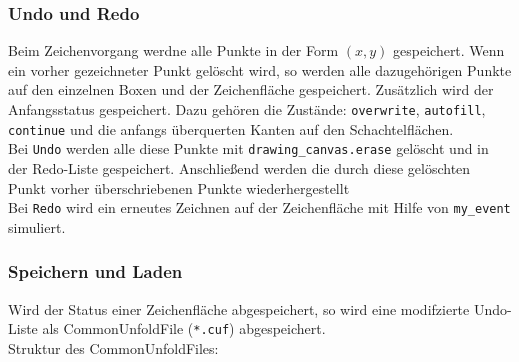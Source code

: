 \subsubsection{Undo und Redo}
\label{subsubsec:undoRedo}

Beim Zeichenvorgang werdne alle Punkte in der Form $(x,y)$ gespeichert. Wenn ein vorher gezeichneter Punkt gelöscht wird, so werden alle dazugehörigen Punkte auf den einzelnen Boxen und der Zeichenfläche gespeichert. Zusätzlich wird der Anfangsstatus gespeichert. Dazu gehören die Zustände: \texttt{overwrite}, \texttt{autofill}, \texttt{continue} und die anfangs überquerten Kanten auf den Schachtelflächen.\\

Bei \texttt{Undo} werden alle diese Punkte mit \texttt{drawing\_canvas.erase} gelöscht und in der Redo-Liste gespeichert. Anschließend werden die durch diese gelöschten Punkt vorher überschriebenen Punkte wiederhergestellt\\

Bei \texttt{Redo} wird ein erneutes Zeichnen auf der Zeichenfläche mit Hilfe
von \texttt{my\_event} simuliert.\\


\subsubsection{Speichern und Laden}
\label{subsubsec:speichernLaden}
Wird der Status einer Zeichenfläche abgespeichert, so wird eine modifzierte Undo-Liste als CommonUnfoldFile (\texttt{*.cuf}) abgespeichert.\\

Struktur des CommonUnfoldFiles:

